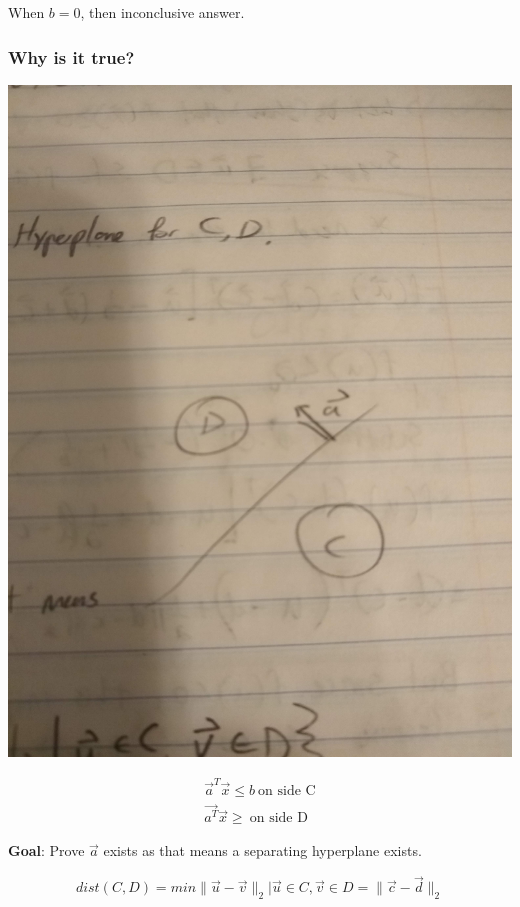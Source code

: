 \documentclass[11pt]{article}
\begin{document}
When \(b = 0\), then inconclusive answer.

\subsubsection{Why is it true?}
\label{sec:org7c4fc92}


\begin{center}
\includegraphics[width=.9\linewidth]{./resources/convex3.jpg}
\end{center}

\begin{equation}
\begin{split}
\vec a^T \vec{x} \leq b \ \text{on side C}\\
\vec{a^T} \vec{x} \geq \ \text{on side D}
\end{split}
\end{equation}

\textbf{Goal}: Prove \(\vec a\) exists as that means a separating hyperplane exists.


$$
dist(C, D) = min{ \| \vec{u} - \vec{v} \|_2 | \vec{u} \in C, \vec{v} \in D} = \|
\vec{c} - \vec{d} \|_2
$$
\end{document}
